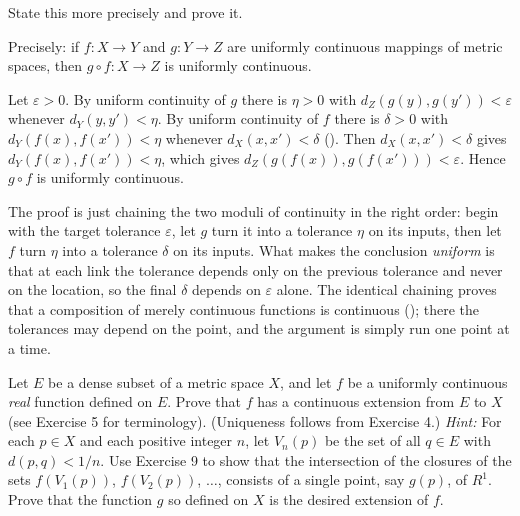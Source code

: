 \documentclass[main.tex]{subfiles}
\begin{document}
State this more precisely and prove it.
\begin{SolutionBlue}
Precisely: if $f : X \to Y$ and $g : Y \to Z$ are uniformly continuous mappings of metric spaces, then $g \circ f : X \to Z$ is uniformly continuous.

Let $\varepsilon > 0$. By uniform continuity of $g$ there is $\eta > 0$ with $d_{Z}(g(y), g(y')) < \varepsilon$ whenever $d_{Y}(y, y') < \eta$. By uniform continuity of $f$ there is $\delta > 0$ with $d_{Y}(f(x), f(x')) < \eta$ whenever $d_{X}(x, x') < \delta$ (). Then $d_{X}(x, x') < \delta$ gives $d_{Y}(f(x), f(x')) < \eta$, which gives $d_{Z}(g(f(x)), g(f(x'))) < \varepsilon$. Hence $g \circ f$ is uniformly continuous.
\end{SolutionBlue}
\begin{Reflection}
The proof is just chaining the two moduli of continuity in the right order: begin with the target tolerance $\varepsilon$, let $g$ turn it into a tolerance $\eta$ on its inputs, then let $f$ turn $\eta$ into a tolerance $\delta$ on its inputs. What makes the conclusion \emph{uniform} is that at each link the tolerance depends only on the previous tolerance and never on the location, so the final $\delta$ depends on $\varepsilon$ alone. The identical chaining proves that a composition of merely continuous functions is continuous (); there the tolerances may depend on the point, and the argument is simply run one point at a time.
\end{Reflection}

Let $E$ be a dense subset of a metric space $X$, and let $f$ be a uniformly continuous \textit{real} function defined on $E$. Prove that $f$ has a continuous extension from $E$ to $X$ (see Exercise 5 for terminology). (Uniqueness follows from Exercise 4.) \textit{Hint:} For each $p \in X$ and each positive integer $n$, let $V_{n}(p)$ be the set of all $q \in E$ with $d(p, q) < 1/n$. Use Exercise 9 to show that the intersection of the closures of the sets $f(V_{1}(p))$, $f(V_{2}(p))$, $\ldots$, consists of a single point, say $g(p)$, of $R^{1}$. Prove that the function $g$ so defined on $X$ is the desired extension of $f$.
\end{document}
